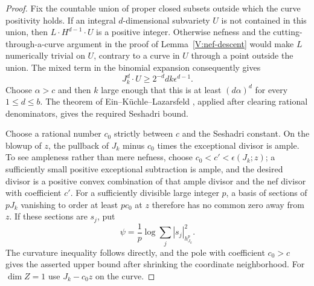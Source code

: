 \begin{proof}
Fix the countable union of proper closed subsets outside which the
curve positivity holds.  If an integral $d$-dimensional subvariety
$U$ is not contained in this union, then
$L\cdot H^{d-1}\cdot U$ is a positive integer.  Otherwise nefness
and the cutting-through-a-curve argument in the proof of
Lemma~\ref{V:nef-descent} would make $L$ numerically trivial on
$U$, contrary to a curve in $U$ through a point outside the union.
The mixed term in the binomial expansion consequently gives
\[
 J_k^d\cdot U\ge 2^{-d}d k\epsilon^{d-1}.
\]
Choose $\alpha>c$ and then $k$ large enough that this is at least
$(d\alpha)^d$ for every $1\le d\le b$.  The theorem of
Ein--K\"uchle--Lazarsfeld \cite[Theorem~3.1]{EKL1995}, applied after
clearing rational denominators, gives the required Seshadri bound.

Choose a rational number $c_0$ strictly between $c$ and the Seshadri
constant.  On the blowup of $z$, the pullback of $J_k$ minus $c_0$
times the exceptional divisor is ample.  To see ampleness rather than
mere nefness, choose $c_0<c'<\epsilon(J_k;z)$; a sufficiently small positive
exceptional subtraction is ample, and the desired divisor is a
positive convex combination of that ample divisor and the nef divisor
with coefficient $c'$.  For a sufficiently divisible large integer
$p$, a basis of sections of $pJ_k$ vanishing to order at least $pc_0$
at $z$ therefore has no common zero away from $z$.  If these sections
are $s_j$, put
\[
 \psi=\frac1p\log\sum_j|s_j|^2_{h_{J_k}^{p}}.
\]
The curvature inequality follows directly, and the pole with coefficient
$c_0>c$ gives the asserted upper bound after shrinking the coordinate
neighborhood.  For $\dim Z=1$ use $J_k-c_0z$ on the curve.
\end{proof}

